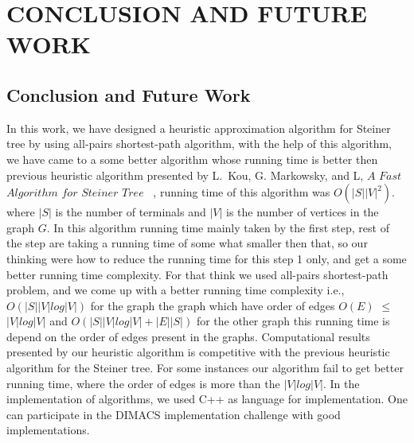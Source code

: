 \chapter{CONCLUSION AND FUTURE WORK} \label{ch_concl}
\section{Conclusion and Future Work}
 In this work, we have designed a heuristic approximation algorithm for Steiner tree by using all-pairs shortest-path algorithm, with the help of this algorithm, we have came to a some better algorithm whose running time is better then previous heuristic algorithm presented by L.~Kou, G. Markowsky, and L, $A$ $Fast$ $Algorithm$ $for$ $Steiner$ $Tree$ ~\cite{markowsky}, running time of this algorithm was $O(|S||V|^2)$. where $|S|$ is the number of terminals and $|V|$ is the number of vertices in the graph $G$. In this algorithm running time mainly taken by the first step, rest of the step are taking a running time of some what smaller then that, so our thinking were how to reduce the running time for this step 1 only, and get a some better running time complexity. For that think we used all-pairs shortest-path problem, and we come up with a better running time complexity i.e., $O(|S||V|log|V|)$ for the graph the graph which have order of edges $O(E)$ $\leq$ $|V|log|V|$ and $O(|S||V|log|V| + |E||S|)$ for the other graph this running time is depend on the order of edges present in the graphs. Computational results presented by our heuristic algorithm is competitive with the previous heuristic algorithm for the Steiner tree. For some instances our algorithm fail to get better running time, where the order of edges is more than the $|V|log|V|$. In the implementation of algorithms, we used C++ as language for implementation. One can participate in the DIMACS implementation challenge with good implementations.
  

